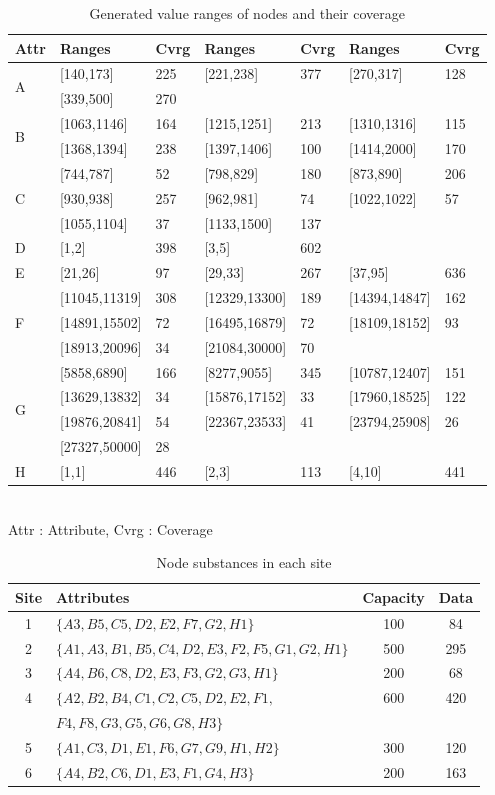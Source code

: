 \documentclass{elsart}
\begin{document}
\begin{table}[tb]
\caption{\label{extracted-nodes-and-its-coverage}Generated value ranges of nodes and their coverage}
\begin{flushleft}
\begin{tabular}{|l|l|l|l|l|l|l|}
\hline 
\multirow{1}{*}{Attr} & Ranges & Cvrg & Ranges & Cvrg & Ranges & Cvrg\tabularnewline
\hline 
\multirow{2}{*}{A} & {[}140,173{]} & 225 & {[}221,238{]} & 377 & {[}270,317{]} & 128\tabularnewline
\cline{2-7} 
 & {[}339,500{]} & 270 & \multicolumn{4}{l|}{}\tabularnewline
\hline 
\multirow{2}{*}{B} & {[}1063,1146{]} & 164 & {[}1215,1251{]} & 213 & {[}1310,1316{]} & 115\tabularnewline
\cline{2-7} 
 & {[}1368,1394{]} & 238 & {[}1397,1406{]} & 100 & {[}1414,2000{]} & 170\tabularnewline
\hline 
\multirow{3}{*}{C} & {[}744,787{]} & 52 & {[}798,829{]} & 180 & {[}873,890{]} & 206\tabularnewline
\cline{2-7} 
 & {[}930,938{]} & 257 & {[}962,981{]} & 74 & {[}1022,1022{]} & 57\tabularnewline
\cline{2-7} 
 & {[}1055,1104{]} & 37 & {[}1133,1500{]} & 137 & \multicolumn{2}{l|}{}\tabularnewline
\hline 
D & {[}1,2{]} & 398 & {[}3,5{]} & 602 & \multicolumn{2}{l|}{}\tabularnewline
\hline 
E & {[}21,26{]} & 97 & {[}29,33{]} & 267 & {[}37,95{]} & 636\tabularnewline
\hline 
\multirow{3}{*}{F} & {[}11045,11319{]} & 308 & {[}12329,13300{]} & 189 & {[}14394,14847{]} & 162\tabularnewline
\cline{2-7} 
 & {[}14891,15502{]} & 72 & {[}16495,16879{]} & 72 & {[}18109,18152{]} & 93\tabularnewline
\cline{2-7} 
 & {[}18913,20096{]} & 34 & {[}21084,30000{]} & 70 & \multicolumn{2}{l|}{}\tabularnewline
\hline 
\multirow{4}{*}{G} & {[}5858,6890{]} & 166 & {[}8277,9055{]} & 345 & {[}10787,12407{]} & 151\tabularnewline
\cline{2-7} 
 & {[}13629,13832{]} & 34 & {[}15876,17152{]} & 33 & {[}17960,18525{]} & 122\tabularnewline
\cline{2-7} 
 & {[}19876,20841{]} & 54 & {[}22367,23533{]} & 41 & {[}23794,25908{]} & 26\tabularnewline
\cline{2-7} 
 & {[}27327,50000{]} & 28 & \multicolumn{4}{l|}{}\tabularnewline
\hline 
H & {[}1,1{]} & 446 & {[}2,3{]} & 113 & {[}4,10{]} & 441\tabularnewline
\hline 
\end{tabular}
\\ Attr : Attribute, Cvrg : Coverage
\end{flushleft}
\end{table}

\begin{table}[tb]
\caption{\label{nodes-substances-on-each-sites}Node substances in each site}
\begin{flushleft}
\begin{tabular}{|c|l|c|c|}
\hline 
Site & Attributes & Capacity & Data\tabularnewline
\hline 
1 & $\{A3,B5,C5,D2,E2,F7,G2,H1\}$ & 100 & 84\tabularnewline
\hline 
2 & $\{A1,A3,B1,B5,C4,D2,E3,F2,F5,G1,G2,H1\}$ & 500 & 295\tabularnewline
\hline 
3 & $\{A4,B6,C8,D2,E3,F3,G2,G3,H1\}$ & 200 & 68\tabularnewline
\hline 
4 & $\{A2,B2,B4,C1,C2,C5,D2,E2,F1,$ & 600 & 420\tabularnewline
 & $F4,F8,G3,G5,G6,G8,H3\}$ &  & \tabularnewline
\hline 
5 & $\{A1,C3,D1,E1,F6,G7,G9,H1,H2\}$ & 300 & 120\tabularnewline
\hline 
6 & $\{A4,B2,C6,D1,E3,F1,G4,H3\}$ & 200 & 163\tabularnewline
\hline 
\end{tabular}
\end{flushleft}
\end{table}
\end{document}
